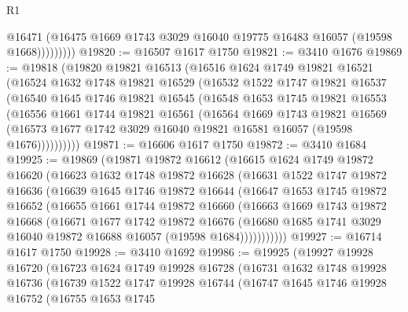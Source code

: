 \begin{lexlean}{R1}
\begin{coremodule}
                  @16471
                  (@16475 @1669 @1743 @3029 @16040 @19775 @16483 @16057 (@19598 @1668)))))))))
@19820 := @16507 @1617 @1750
@19821 := @3410 @1676
@19869 := @19818
    (@19820
      @19821
      @16513
      (@16516
        @1624
        @1749
        @19821
        @16521
        (@16524
          @1632
          @1748
          @19821
          @16529
          (@16532
            @1522
            @1747
            @19821
            @16537
            (@16540
              @1645
              @1746
              @19821
              @16545
              (@16548
                @1653
                @1745
                @19821
                @16553
                (@16556
                  @1661
                  @1744
                  @19821
                  @16561
                  (@16564
                    @1669
                    @1743
                    @19821
                    @16569
                    (@16573 @1677 @1742 @3029 @16040 @19821 @16581 @16057 (@19598 @1676))))))))))
@19871 := @16606 @1617 @1750
@19872 := @3410 @1684
@19925 := @19869
    (@19871
      @19872
      @16612
      (@16615
        @1624
        @1749
        @19872
        @16620
        (@16623
          @1632
          @1748
          @19872
          @16628
          (@16631
            @1522
            @1747
            @19872
            @16636
            (@16639
              @1645
              @1746
              @19872
              @16644
              (@16647
                @1653
                @1745
                @19872
                @16652
                (@16655
                  @1661
                  @1744
                  @19872
                  @16660
                  (@16663
                    @1669
                    @1743
                    @19872
                    @16668
                    (@16671
                      @1677
                      @1742
                      @19872
                      @16676
                      (@16680 @1685 @1741 @3029 @16040 @19872 @16688 @16057 (@19598 @1684)))))))))))
@19927 := @16714 @1617 @1750
@19928 := @3410 @1692
@19986 := @19925
    (@19927
      @19928
      @16720
      (@16723
        @1624
        @1749
        @19928
        @16728
        (@16731
          @1632
          @1748
          @19928
          @16736
          (@16739
            @1522
            @1747
            @19928
            @16744
            (@16747
              @1645
              @1746
              @19928
              @16752
              (@16755
                @1653
                @1745

\end{coremodule}
\end{lexlean}
